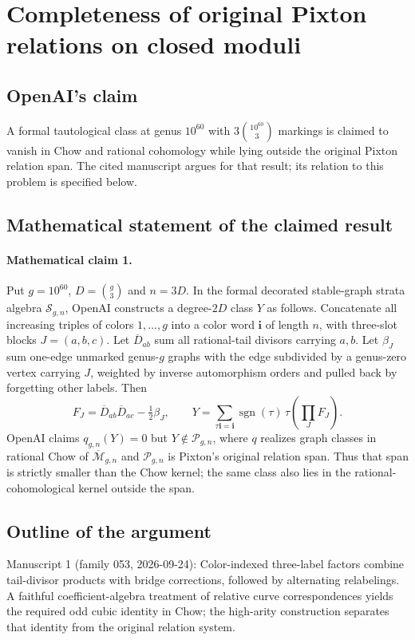 \documentclass[11pt]{article}
\begin{document}
\section*{Completeness of original Pixton relations on closed moduli}

\subsection{OpenAI's claim}
A formal tautological class at genus $10^{60}$ with $3\binom{10^{60}}3$ markings is claimed to vanish in Chow and rational cohomology while lying outside the original Pixton relation span. The cited manuscript argues for that result; its relation to this problem is specified below.

\subsection{Mathematical statement of the claimed result}
\paragraph{Mathematical claim 1.} Put $g=10^{60}$, $D=\binom g3$ and $n=3D$. In the formal decorated stable-graph strata algebra $\mathcal S_{g,n}$, OpenAI constructs a degree-$2D$ class $Y$ as follows. Concatenate all increasing triples of colors $1,\ldots,g$ into a color word $\mathbf i$ of length $n$, with three-slot blocks $J=(a,b,c)$. Let $\overline D_{ab}$ sum all rational-tail divisors carrying $a,b$. Let $\beta_J$ sum one-edge unmarked genus-$g$ graphs with the edge subdivided by a genus-zero vertex carrying $J$, weighted by inverse automorphism orders and pulled back by forgetting other labels. Then
\[
F_J=\overline D_{ab}\overline D_{ac}-\tfrac12\beta_J,\qquad
Y=\sum_{\tau\mathbf i=\mathbf i}\operatorname{sgn}(\tau)\,\tau\left(\prod_JF_J\right).
\]
OpenAI claims $q_{g,n}(Y)=0$ but $Y\notin\mathcal P_{g,n}$, where $q$ realizes graph classes in rational Chow of $\overline{\mathcal M}_{g,n}$ and $\mathcal P_{g,n}$ is Pixton's original relation span. Thus that span is strictly smaller than the Chow kernel; the same class also lies in the rational-cohomological kernel outside the span.

\subsection{Outline of the argument}
Manuscript 1 (family 053, 2026-09-24): Color-indexed three-label factors combine tail-divisor products with bridge corrections, followed by alternating relabelings. A faithful coefficient-algebra treatment of relative curve correspondences yields the required odd cubic identity in Chow; the high-arity construction separates that identity from the original relation system.
\end{document}
